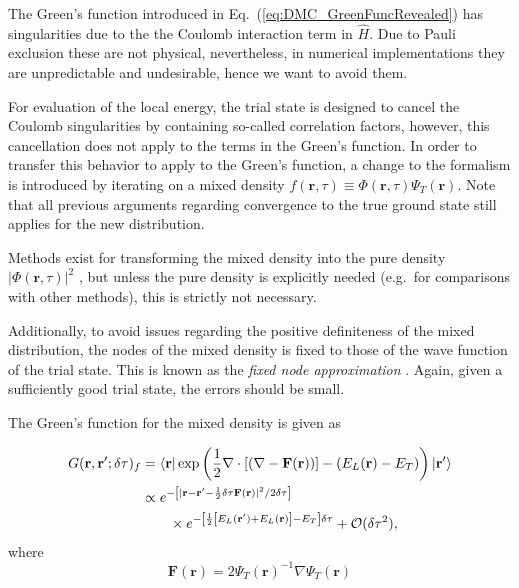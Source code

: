 \documentclass[amsmath, amssymb, aps, floatfix, nofootinbib, preprintnumbers,showpacs, superscriptaddress, twocolumn]{revtex4-1}
\newcommand{\ket}[1]{| #1 \rangle}
\newcommand{\bra}[1]{\langle #1 |}
\begin{document}
The Green's function introduced in Eq.~(\ref{eq:DMC_GreenFuncRevealed}) has singularities due to the the Coulomb interaction term in $\hat{H}$. Due to Pauli exclusion these are not physical, nevertheless, in numerical implementations they are unpredictable and undesirable, hence we want to avoid them.

For evaluation of the local energy, the trial state is designed to cancel the Coulomb singularities by containing so-called correlation factors, however, this cancellation does not apply to the terms in the Green's function. In order to transfer this behavior to apply to the Green's function, a change to the formalism is introduced by iterating on a mixed density $f(\mathbf{r}, \tau) \equiv \Phi(\mathbf{r}, \tau)\Psi_T(\mathbf{r})$. Note that all previous arguments regarding convergence to the true ground state still applies for the new distribution.

Methods exist for transforming the mixed density into the pure density $|\Phi(\mathbf{r}, \tau)|^2$ \cite{abInitioMC}, but unless the pure density is explicitly needed (e.g.~for comparisons with other methods), this is strictly not necessary.

Additionally, to avoid issues regarding the positive definiteness of the mixed distribution, the nodes of the mixed density is fixed to those of the wave function of the trial state. This is known as the \textit{fixed node approximation} \cite{umrigar:2865, abInitioMC}. Again, given a sufficiently good trial state, the errors should be small.

The Green's function for the mixed density is given as \cite{umrigar:2865}

\begin{align}
  G(\mathbf{r}, \mathbf{r}'; \delta\tau)_f &= \bra{\mathbf{r}} \exp\left({\frac{1}{2}\nabla\cdot \left[\left(\nabla - \mathbf{F}(\mathbf{r})\right)\right] - \left(E_L(\mathbf{r}) - E_T\right)}\right)\ket{\mathbf{r}'} \label{eq:DMC_IS_GF_raw}\\
  &\propto e^{-\left[|\mathbf{r} - \mathbf{r}' - \frac{1}{2}\delta\tau\mathbf{F}(\mathbf{r})|^2/2\delta\tau\right]} \label{eq:DMC_IS_GF}\\
  &\qquad\times e^{-\left[\frac{1}{2}\left[E_L(\mathbf{r'}) + E_L(\mathbf{r})\right] - E_T\right]\delta\tau} + \mathcal{O}(\delta\tau^2), \notag
\end{align}
where
\begin{equation}
  \mathbf{F}(\mathbf{r}) = 2\Psi_T(\mathbf{r})^{-1} \nabla \Psi_T(\mathbf{r})
\end{equation}
\end{document}
